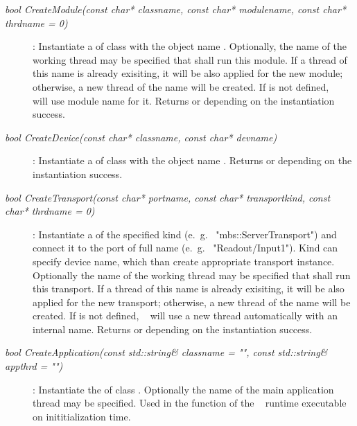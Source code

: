 \begin{description}
	 
\item[\em bool CreateModule\small (const char* classname, const char* modulename, const char* thrdname = 0)] : 
Instantiate a  of class  with the object name
. Optionally, the name of the working thread  may
be specified that shall run this module. If a thread of this name is already exisiting, 
it will be also applied for the new module; otherwise, a new thread of the name
will be created. If  is not defined, \dabc~ will use module name for it.
Returns  or  depending on the instantiation success.

\item[\em bool CreateDevice\small (const char* classname, const char* devname)]:
Instantiate a  of class  with the object name
. Returns  or  depending on the instantiation success.






\item[\em bool CreateTransport\small (const char* portname, const char* transportkind, const char* thrdname = 0)] :
Instantiate a  of the specified kind  (e.~g.~ "mbs::ServerTransport")
and connect it to the port of full name  (e.~g.~ "Readout/Input1").
Kind can specify device name, which than create appropriate transport instance.
Optionally the name of the working thread
 may
be specified that shall run this transport. If a thread of this name is already exisiting, 
it will be also applied for the new transport; otherwise, a new thread of the name
will be created. If  is not defined, \dabc~ will use a new 
thread automatically with an internal name.
Returns  or  depending on the instantiation success.

  
\item[\em bool CreateApplication\small (const std::string& classname = "", const std::string& appthrd = "")] :
Instantiate the  of class . Optionally
the name  of the main application thread may be specified.
Used in the  function of the \dabc~ runtime executable on
inititialization time.

\end{description}	 


